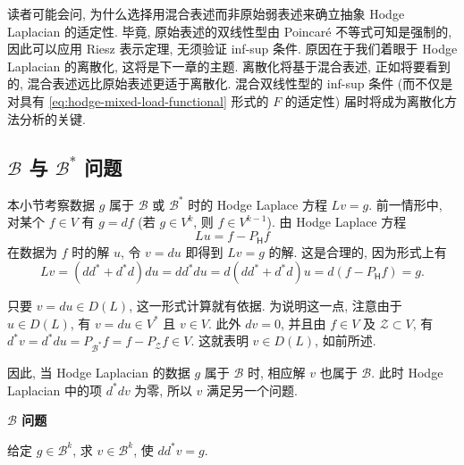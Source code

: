 
\begin{Remark}\label{rem:hodge-mixed-discretization-motivation}
{读者可能会问, 为什么选择用混合表述而非原始弱表述来确立抽象 Hodge Laplacian 的适定性. 毕竟, 原始表述的双线性型由 Poincaré 不等式可知是强制的, 因此可以应用 Riesz 表示定理, 无须验证 inf-sup 条件. 原因在于我们着眼于 Hodge Laplacian 的离散化, 这将是下一章的主题. 离散化将基于混合表述, 正如将要看到的, 混合表述远比原始表述更适于离散化. 混合双线性型的 inf-sup 条件 (而不仅是对具有 \eqref{eq:hodge-mixed-load-functional} 形式的 $F$ 的适定性) 届时将成为离散化方法分析的关键.}
\end{Remark}

\subsection{{$\mathcal B$ 与 $\mathcal B^*$ 问题}}\label{subsec:boundary-coboundary-problems}

{本小节考察数据 $g$ 属于 $\mathcal B$ 或 $\mathcal B^*$ 时的 Hodge Laplace 方程 $Lv=g$. 前一情形中, 对某个 $f\in V$ 有 $g=df$ (若 $g\in V^k$, 则 $f\in V^{k-1}$). 由 Hodge Laplace 方程}
\begin{equation}\label{eq:hodge-boundary-problem-potential}
Lu=f-P_{\mathsf H}f
\end{equation}
{在数据为 $f$ 时的解 $u$, 令 $v=du$ 即得到 $Lv=g$ 的解. 这是合理的, 因为形式上有}
\[
Lv=(dd^*+d^*d)du=dd^*du=d(dd^*+d^*d)u=d(f-P_{\mathsf H}f)=g.
\]

{只要 $v=du\in D(L)$, 这一形式计算就有依据. 为说明这一点, 注意由于 $u\in D(L)$, 有 $v=du\in V^*$ 且 $v\in V$. 此外 $dv=0$, 并且由 $f\in V$ 及 $\mathcal Z\subset V$, 有 $d^*v=d^*du=P_{\mathcal B^*}f=f-P_{\mathcal Z}f\in V$. 这就表明 $v\in D(L)$, 如前所述.}

{因此, 当 Hodge Laplacian 的数据 $g$ 属于 $\mathcal B$ 时, 相应解 $v$ 也属于 $\mathcal B$. 此时 Hodge Laplacian 中的项 $d^*dv$ 为零, 所以 $v$ 满足另一个问题.}

\medskip\noindent\textbf{{$\mathcal B$ 问题}}\par
{给定 $g\in\mathcal B^k$, 求 $v\in\mathcal B^k$, 使 $dd^*v=g$.}

